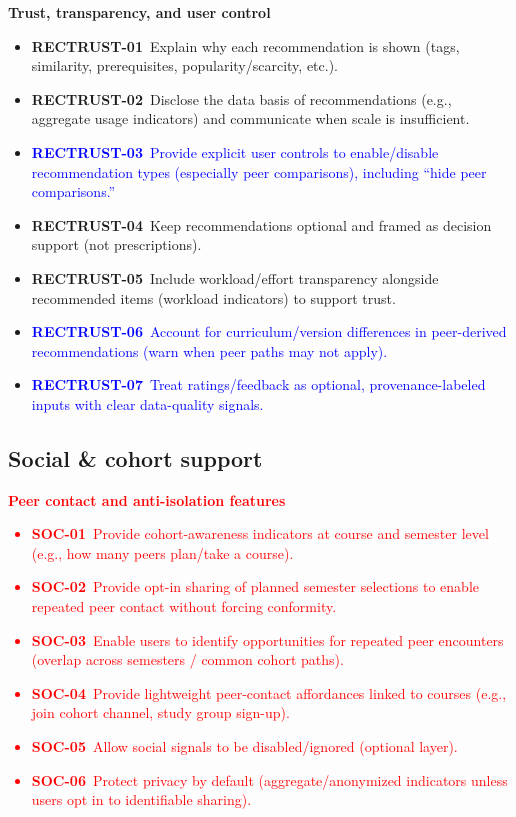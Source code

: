 \textbf{Trust, transparency, and user control}
\begin{itemize}
  \item \textbf{RECTRUST-01}~Explain why each recommendation is shown (tags, similarity, prerequisites, popularity/scarcity, etc.).
  \item \textbf{RECTRUST-02}~Disclose the data basis of recommendations (e.g., aggregate usage indicators) and communicate when scale is insufficient.
  \item \textcolor{blue}{\textbf{RECTRUST-03}~Provide explicit user controls to enable/disable recommendation types (especially peer comparisons), including “hide peer comparisons.”}
  \item \textbf{RECTRUST-04}~Keep recommendations optional and framed as decision support (not prescriptions).
  \item \textbf{RECTRUST-05}~Include workload/effort transparency alongside recommended items (workload indicators) to support trust.
  \item \textcolor{blue}{\textbf{RECTRUST-06}~Account for curriculum/version differences in peer-derived recommendations (warn when peer paths may not apply).}
  \item \textcolor{blue}{\textbf{RECTRUST-07}~Treat ratings/feedback as optional, provenance-labeled inputs with clear data-quality signals.}
\end{itemize}


\subsection*{Social \& cohort support}

\textcolor{red}{\textbf{Peer contact and anti-isolation features}
\begin{itemize}
  \item \textbf{SOC-01}~Provide cohort-awareness indicators at course and semester level (e.g., how many peers plan/take a course).
  \item \textbf{SOC-02}~Provide opt-in sharing of planned semester selections to enable repeated peer contact without forcing conformity.
  \item \textbf{SOC-03}~Enable users to identify opportunities for repeated peer encounters (overlap across semesters / common cohort paths).
  \item \textbf{SOC-04}~Provide lightweight peer-contact affordances linked to courses (e.g., join cohort channel, study group sign-up).
  \item \textbf{SOC-05}~Allow social signals to be disabled/ignored (optional layer).
  \item \textbf{SOC-06}~Protect privacy by default (aggregate/anonymized indicators unless users opt in to identifiable sharing).
\end{itemize}}


